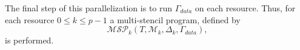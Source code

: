 




 The final step of this parallelization is to run $\Gamma_{data}$ on each resource. Thus, for each resource $0 \leq k \leq p-1$ a multi-stencil program, defined by
\begin{equation}
\mathcal{MSP}_k(T,\mathcal{M}_k,\Delta_k,\Gamma_{data}),
\end{equation}
is performed.


